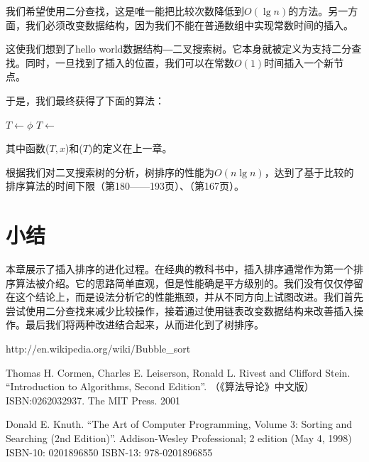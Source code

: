 \documentclass[UTF8]{article}
\begin{document}
我们希望使用二分查找，这是唯一能把比较次数降低到$O(\lg n)$的方法。另一方面，我们必须改变数据结构，因为我们不能在普通数组中实现常数时间的插入。

这使我们想到了hello world数据结构―二叉搜索树。它本身就被定义为支持二分查找。同时，一旦找到了插入的位置，我们可以在常数$O(1)$时间插入一个新节点。

于是，我们最终获得了下面的算法：

\begin{algorithmic}[1]
  \State $T \gets \phi$
    \State $T \gets $ 
  \EndFor
  \State \Return {}
\EndFunction
\end{algorithmic}

其中函数($T, x$)和($T$)的定义在上一章。

根据我们对二叉搜索树的分析，树排序的性能为$O(n \lg n)$，达到了基于比较的排序算法的时间下限\cite{Knuth-V3}（第180——193页）、\cite{CLRS}（第167页）。

\section{小结}
本章展示了插入排序的进化过程。在经典的教科书中，插入排序通常作为第一个排序算法被介绍。它的思路简单直观，但是性能确是平方级别的。我们没有仅仅停留在这个结论上，而是设法分析它的性能瓶颈，并从不同方向上试图改进。我们首先尝试使用二分查找来减少比较操作，接着通过使用链表改变数据结构来改善插入操作。最后我们将两种改进结合起来，从而进化到了树排序。

\ifx\wholebook\relax \else
\begin{thebibliography}{99}

http://en.wikipedia.org/wiki/Bubble\_sort

Thomas H. Cormen, Charles E. Leiserson, Ronald L. Rivest and Clifford Stein.
``Introduction to Algorithms, Second Edition''. （《算法导论》中文版）ISBN:0262032937. The MIT Press. 2001

Donald E. Knuth. ``The Art of Computer Programming, Volume 3: Sorting and Searching (2nd Edition)''. Addison-Wesley Professional; 2 edition (May 4, 1998) ISBN-10: 0201896850 ISBN-13: 978-0201896855

\end{thebibliography}
\end{document}
